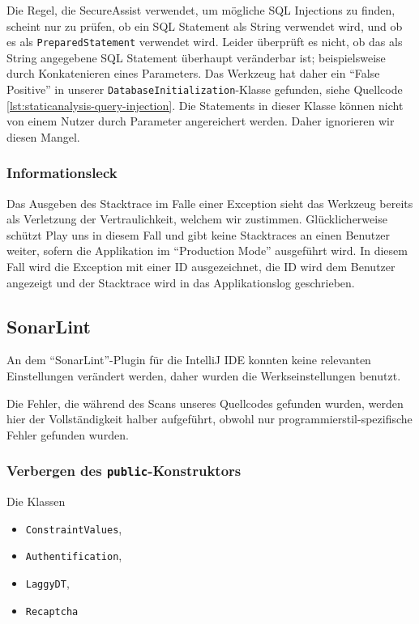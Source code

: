 \documentclass[12pt,DIV14,BCOR10mm,a4paper,parskip=half-,headsepline,headinclude,english,ngerman,bibliography=totocnumbered]{scrreprt}
\begin{document}
Die Regel, die SecureAssist verwendet, um mögliche SQL Injections zu finden, scheint nur zu prüfen, ob ein SQL Statement als String verwendet wird, und ob es als \texttt{Prepared\-Statement} verwendet wird.
Leider überprüft es nicht, ob das als String angegebene SQL Statement überhaupt veränderbar ist; beispielsweise durch Konkatenieren eines Parameters.
Das Werkzeug hat daher ein \enquote{False Positive} in unserer \texttt{Database\-Initialization}-Klasse gefunden, siehe Quellcode \ref{lst:staticanalysis-query-injection}.
Die Statements in dieser Klasse können nicht von einem Nutzer durch Parameter angereichert werden. Daher ignorieren wir diesen Mangel.

\subsubsection{Informationsleck}

Das Ausgeben des Stacktrace im Falle einer Exception sieht das Werkzeug bereits als Verletzung der Vertraulichkeit, welchem wir zustimmen.
Glücklicherweise schützt Play uns in diesem Fall und gibt keine Stacktraces an einen Benutzer weiter, sofern die Applikation im \enquote{Production Mode} ausgeführt wird.
In diesem Fall wird die Exception mit einer ID ausgezeichnet, die ID wird dem Benutzer angezeigt und der Stacktrace wird in das Applikationslog geschrieben.

\subsection{SonarLint}

An dem \enquote{SonarLint}-Plugin für die IntelliJ IDE konnten keine relevanten Einstellungen verändert werden, daher wurden die Werkseinstellungen benutzt.

Die Fehler, die während des Scans unseres Quellcodes gefunden wurden, werden hier der Vollständigkeit halber aufgeführt, obwohl nur programmierstil-spezifische Fehler gefunden wurden.

\subsubsection{Verbergen des \texttt{public}-Konstruktors}

Die Klassen

\begin{itemize}
  \item \texttt{ConstraintValues},
  \item \texttt{Authentification},
  \item \texttt{LaggyDT},
  \item \texttt{Recaptcha}
\end{itemize}
\end{document}
